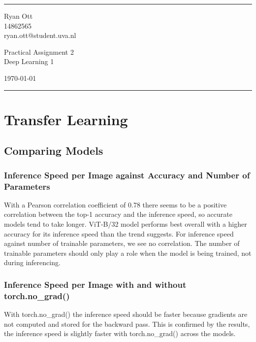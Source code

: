 \documentclass[a4paper]{article}
\begin{document}

\fancyhead[C]{}
\hrule \medskip %
\begin{minipage}{0.295\textwidth} 
\raggedright
\footnotesize
Ryan Ott \hfill\\   
14862565 \hfill\\
ryan.ott@student.uva.nl
\end{minipage}
\begin{minipage}{0.4\textwidth} 
\centering 
\large 
Practical Assignment 2\\ 
\normalsize 
Deep Learning 1\\ 
\end{minipage}
\begin{minipage}{0.295\textwidth} 
\raggedleft
\today\hfill\\
\end{minipage}
\medskip\hrule 
\bigskip


\section{Transfer Learning}
\subsection{Comparing Models}
\subsubsection{Inference Speed per Image against Accuracy and Number of Parameters}
With a Pearson correlation coefficient of 0.78 there seems to be a positive correlation between the top-1 accuracy
and the inference speed, so accurate models tend to take longer. ViT-B/32 model performs best overall with a higher
accuracy for its inference speed than the trend suggests.
For inference speed against number of trainable parameters, we see no correlation. The number of trainable parameters
should only play a role when the model is being trained, not during inferencing.

\subsubsection{Inference Speed per Image with and without torch.no\_grad()}
With torch.no\_grad() the inference speed should be faster because gradients are not computed and stored for the
backward pass. This is confirmed by the results, the inference speed is slightly faster with torch.no\_grad() across
the models.
\end{document}
